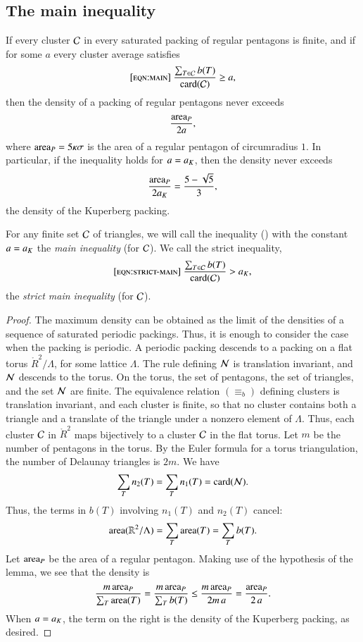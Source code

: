 \subsection{The main inequality}

\begin{lemma}  
If  every cluster $\mathcal C$ in every saturated packing of regular
  pentagons is finite, and if for some $a$ every cluster average
  satisfies
\begin{equation}\libel{eqn:main}
\frac{\sum_{T\in \C} b(T)}{\card(\C)} \ge a,
\end{equation}
then the density of a packing of regular pentagons never exceeds 
\[
\frac{{\operatorname{area}}_P} {2 a},
\]
where ${\operatorname{area}}_P = 5\kappa\sigma$ is the area of a regular pentagon of
circumradius $1$.  In particular, if the inequality holds for $a=a_K$,
then the density never exceeds
\[
\frac{{\operatorname{area}}_P}{2 a_K} = \frac{5 - \sqrt{5}}{3},
\] %
the density of the Kuperberg packing.
\end{lemma}

For any finite set $\mathcal C$ of triangles, we will call the inequality
() with the constant $a=a_K$ the {\it main inequality}
(for $\mathcal C$).  We call the strict inequality,
\begin{equation}\libel{eqn:strict-main}
\frac{\sum_{T\in \C} b(T)}{\card(\C)} > \aK,
\end{equation}
the {\it strict main inequality} (for $\mathcal C$).


\begin{proof} The maximum density can be obtained as the limit of the
  densities of a sequence of saturated periodic packings.  Thus, it is
  enough to consider the case when the packing is periodic.  A
  periodic packing descends to a packing on a flat torus
  $\ring{R}^2/\Lambda$, for some lattice $\Lambda$.  The rule defining
  $\mathcal N$ is translation invariant, and $\mathcal N$ descends to the torus.  On
  the torus, the set of pentagons, the set of triangles, and the set
  $\mathcal N$ are finite.  The equivalence relation $(\equiv_b)$ defining
  clusters is translation invariant, and each cluster is finite, so
  that no cluster contains both a triangle and a translate of the
  triangle under a nonzero element of $\Lambda$.  Thus, each cluster
  $\mathcal C$ in $\ring{R}^2$ maps bijectively to a cluster $\mathcal C$ in the flat
  torus.  Let $m$ be the number of pentagons in the torus.  By the
  Euler formula for a torus triangulation, the number of Delaunay
  triangles is $2m$.  We have
\[
\sum_{T} n_2(T) =  \sum_{T} n_1(T) = 
{\operatorname{card}}(\mathcal N).
\]
Thus, the terms in $b(T)$ involving $n_1(T)$ and $n_2(T)$ cancel:
\[
{\operatorname{area}}(\mathbb{R}^2/\Lambda) = \sum_T {\operatorname{area}}(T) = \sum_T b(T).
\]    
Let ${\operatorname{area}}_P$ be the area of a regular pentagon.  Making use of the
hypothesis of the lemma, we see that the density is
\[
\frac{m\, {\operatorname{area}}_P}{\sum_T {\operatorname{area}}(T)} 
=\frac{m\, {\operatorname{area}}_P}{\sum_T b(T)} \le\frac{m\, {\operatorname{area}}_P}{2 m\, a} 
= \frac{{\operatorname{area}}_P}{2\, a}.
\]
When $a=a_K$, the term on the right is the density of the Kuperberg
packing, as desired.
\end{proof}

